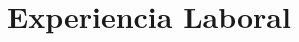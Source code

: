 \documentclass[letterpaper,12pt]{fed-res}
\begin{document}


\section{Experiencia Laboral}

\end{document}
